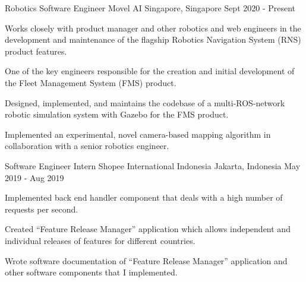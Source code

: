 

\begin{cventries}
\cventry
{Robotics Software Engineer} %
{Movel AI} %
{Singapore, Singapore} %
{Sept 2020 - Present} %
{
	\begin{cvitems} %
		\item {Works closely with product manager and other robotics and web engineers in the development and maintenance of the flagship Robotics Navigation System (RNS) product features.}
		\item {One of the key engineers responsible for the creation and initial development of the Fleet Management System (FMS) product.}
		\item {Designed, implemented, and maintains the codebase of a multi-ROS-network robotic simulation system with Gazebo for the FMS product.}
		\item {Implemented an experimental, novel camera-based mapping algorithm in collaboration with a senior robotics engineer.}
	\end{cvitems}
}

\cventry
{Software Engineer Intern} %
{Shopee International Indonesia} %
{Jakarta, Indonesia} %
{May 2019 - Aug 2019} %
{
	\begin{cvitems} %
		\item {Implemented back end handler component that deals with a high number of requests per second.}
		\item {Created ``Feature Release Manager'' application which allows independent and individual releases of features for different countries.}
		\item {Wrote software documentation of ``Feature Release Manager'' application and other software components that I implemented.}
	\end{cvitems}
}



\end{cventries}
